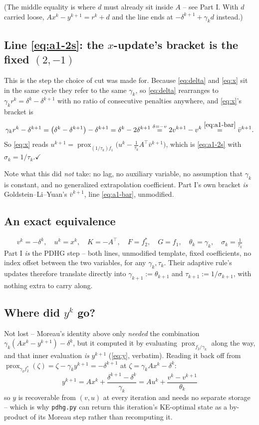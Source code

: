 \documentclass[11pt]{article}
\newcommand{\code}[1]{\texttt{#1}}
\newcommand{\prox}{\operatorname{prox}}
\begin{document}
(The middle equality is where $d$ must already sit inside $A$ -- see Part I. With
$d$ carried loose, $Ax^k-y^{k+1}=r^k+d$ and the line ends at
$-\delta^{k+1}+\gamma_kd$ instead.)

\subsection*{Line \eqref{eq:a1-2s}: the $x$-update's bracket is the fixed $(2,-1)$}
This is the step the choice of cut was made for. Because \eqref{eq:delta} and
\eqref{eq:x} sit in the same cycle they refer to the same $\gamma_k$, so
\eqref{eq:delta} rearranges to $\gamma_kr^{k}=\delta^{k}-\delta^{k+1}$ with no
ratio of consecutive penalties anywhere, and \eqref{eq:x}'s bracket is
\[
\gamma_kr^{k}-\delta^{k+1}
=\big(\delta^{k}-\delta^{k+1}\big)-\delta^{k+1}
=\delta^{k}-2\delta^{k+1}
\overset{\delta=-v}{=}2v^{k+1}-v^{k}
\overset{\eqref{eq:a1-bar}}{=}\bar v^{k+1}.
\]
So \eqref{eq:x} reads
$u^{k+1}=\prox_{(1/\tau_k)f_1}\big(u^k-\tfrac1{\tau_k}A^\top\bar v^{k+1}\big)$,
which is \eqref{eq:a1-2s} with $\sigma_k=1/\tau_k$.\quad$\checkmark$

Note what this did \emph{not} take: no lag, no auxiliary variable, no assumption
that $\gamma_k$ is constant, and no generalized extrapolation coefficient.
Part I's own bracket \emph{is} Goldstein--Li--Yuan's $\bar v^{k+1}$, line
\eqref{eq:a1-bar}, unmodified.

\subsection*{An exact equivalence}
\[
\boxed{v^k=-\delta^k,\quad u^k=x^k,\quad K=-A^\top,\quad F=f_2^*,\quad G=f_1,\quad
\theta_k=\gamma_k,\quad \sigma_k=\tfrac1{\tau_k}}
\]
Part I \emph{is} the PDHG step -- both lines, unmodified template, fixed
coefficients, no index offset between the two variables, for any
$\gamma_k,\tau_k$. Their adaptive rule's updates therefore translate directly into
$\gamma_{k+1}:=\theta_{k+1}$ and $\tau_{k+1}:=1/\sigma_{k+1}$, with nothing extra
to carry along.

\subsection*{Where did $y^k$ go?}
Not lost -- Moreau's identity above only \emph{needed} the combination
$\gamma_k(Ax^k-y^{k+1})-\delta^k$, but it computed it by evaluating
$\prox_{f_2/\gamma_k}$ along the way, and that inner evaluation \emph{is}
$y^{k+1}$ (\eqref{eq:y}, verbatim). Reading it back off from
$\prox_{\gamma_kf_2^*}(\zeta)=\zeta-\gamma_ky^{k+1}=-\delta^{k+1}$ at
$\zeta=\gamma_kAx^k-\delta^k$:
\begin{equation}
y^{k+1}=Ax^{k}+\frac{\delta^{k+1}-\delta^{k}}{\gamma_k}
=Au^{k}+\frac{v^{k}-v^{k+1}}{\theta_k} \label{eq:yback}
\end{equation}
so $y$ is recoverable from $(v,u)$ at every iteration and needs no separate
storage -- which is why \code{pdhg.py} can return this iteration's KE-optimal
state as a by-product of its Moreau step rather than recomputing it.
\end{document}

